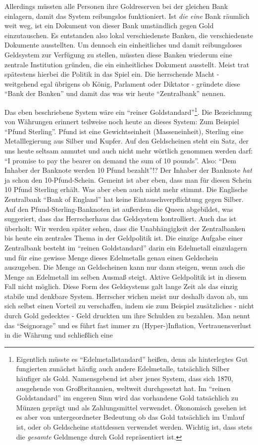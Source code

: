 Allerdings müssten alle Personen ihre Goldreserven bei der gleichen Bank einlagern, damit das System reibungslos funktioniert. Ist \textit{die eine} Bank räumlich weit weg, ist ein Dokument von dieser Bank umständlich gegen Gold einzutauschen. Es entstanden also lokal verschiedenste Banken, die verschiedenste Dokumente ausstellten. Um dennoch ein einheitliches und damit reibungsloses Geldsystem zur Verfügung zu stellen, müssten diese Banken wiederum eine zentrale Institution gründen, die ein einheitliches Dokument ausstellt. Meist trat spätestens hierbei die Politik in das Spiel ein. Die herrschende Macht - weitgehend egal übrigens ob König, Parlament oder Diktator - gründete diese "`Bank der Banken"' und damit das was wir heute "`Zentralbank"' nennen.

Das eben beschriebene System wäre ein "`reiner Goldstandard"'\footnote{Eigentlich müsste es "`Edelmetallstandard"' heißen, denn als hinterlegtes Gut fungierten zunächst häufig auch andere Edelmetalle, tatsächlich Silber häufiger als Gold. Namensgebend ist aber jenes System, dass sich 1870, ausgehende von Großbritannien, weltweit durchgesetzt hat. Im "`reinen Goldstandard"' im engeren Sinn wird das vorhandene Gold tatsächlich zu Münzen geprägt und als Zahlungsmittel verwendet. Ökonomisch gesehen ist es aber von untergeordneter Bedeutung ob das Gold tatsächlich im Umlauf ist, oder ob Geldscheine stattdessen verwendet werden. Wichtig ist, dass stets die \textit{gesamte} Geldmenge durch Gold repräsentiert ist.}. Die Bezeichnung von Währungen erinnert teilweise noch heute an dieses System: Zum Beispiel "`Pfund Sterling"'. Pfund ist eine Gewichtseinheit (Masseneinheit), Sterling eine Metalllegierung aus Silber und Kupfer. Auf den Geldscheinen steht ein Satz, der uns heute seltsam anmutet und auch nicht mehr wörtlich genommen werden darf: "`I promise to pay the bearer on demand the sum of 10 pounds"'. Also: "`Dem Inhaber der Banknote werden 10 Pfund bezahlt"'!? Der Inhaber der Banknote \textit{hat} ja schon den 10-Pfund-Schein. Gemeint ist aber eben, dass man für diesen Schein 10 Pfund Sterling erhält. Was aber eben auch nicht mehr stimmt. Die Englische Zentralbank "`Bank of England"' hat keine Eintauschverpflichtung gegen Silber. Auf den Pfund-Sterling-Banknoten ist außerdem die Queen abgebildet, was suggeriert, dass das Herrscherhaus das Geldsystem kontrolliert. Auch das ist überholt: Wir werden später sehen, dass die Unabhängigkeit der Zentralbanken bis heute ein zentrales Thema in der Geldpolitik ist. Die einzige Aufgabe einer Zentralbank besteht im "`reinen Goldstandard"' darin ein Edelmetall einzulagern und für eine gewisse Menge dieses Edelmetalls genau einen Geldschein auszugeben. Die Menge an Geldscheinen kann nur dann steigen, wenn auch die Menge an Edelmetall im selben Ausmaß steigt. Aktive Geldpolitik ist in diesem Fall nicht möglich. Diese Form des Geldsystems galt lange Zeit als das einzig stabile und denkbare System. Herrscher wichen meist nur deshalb davon ab, um sich selbst einen Vorteil zu verschaffen, indem sie zum Beispiel zusätzliches - nicht durch Gold gedecktes - Geld druckten um ihre Schulden zu bezahlen. Man nennt das "`Seignorage"' und es führt fast immer zu (Hyper-)Inflation, Vertrauensverlust in die Währung und schließlich eine 